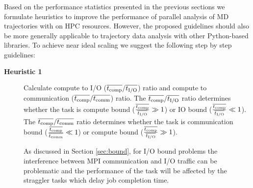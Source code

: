 \label{guideline}
Based on the performance statistics presented in the previous sections we formulate heuristics to improve the performance of parallel analysis of MD trajectories with  on HPC resources.
However, the proposed guidelines should also be more generally applicable to trajectory data analysis with other Python-based libraries.
To achieve near ideal scaling we suggest the following step by step guidelines:

\begin{description}
\item[\textbf{Heuristic 1}] Calculate compute to I/O ($\overline{{t}_{\text{comp}}}/\overline{{t}_{\text{I/O}}}$) ratio and compute to communication ($\overline{{t}_{\text{comp}}}/\overline{t_{\text{comm}}}$) ratio. The $\overline{{t}_{\text{comp}}}/\overline{{t}_{\text{I/O}}}$ ratio determines whether the task is compute bound ($\frac{\overline{{t}_{\text{comp}}}}{\overline{{t}_{\text{I/O}}}} \gg 1$) or IO bound ($\frac{\overline{{t}_{\text{comp}}}}{\overline{{t}_{\text{I/O}}}} \ll 1$).
The $\overline{{t}_{\text{comp}}}/\overline{t_{\text{comm}}}$ ratio determines whether the task is communication bound ($\frac{\overline{{t}_{\text{comp}}}}{\overline{t_{\text{comm}}}} \ll 1$) or compute bound ($\frac{\overline{{t}_{\text{comp}}}}{\overline{{t}_{\text{I/O}}}} \gg 1$).

As discussed in Section \ref{sec:bound}, for I/O bound problems the interference between MPI communication and I/O traffic can be problematic \cite{VMD2013, Kevin2018, Brown:2018ab} and the performance of the task will be affected by the straggler tasks which delay job completion time.
  

\end{description}

